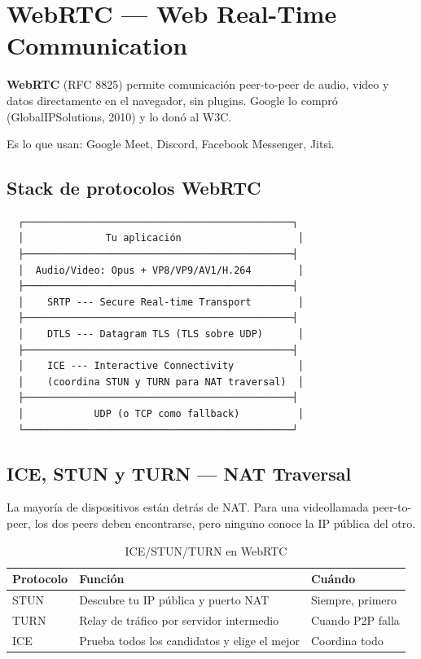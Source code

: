 \section{ WebRTC --- Web Real-Time Communication}

\begin{concepto}
\textbf{WebRTC} (RFC 8825) permite comunicación peer-to-peer de audio,
video y datos directamente en el navegador, sin plugins. Google lo compró
(GlobalIPSolutions, 2010) y lo donó al W3C.

Es lo que usan: Google Meet, Discord, Facebook Messenger, Jitsi.
\end{concepto}

\subsection{Stack de protocolos WebRTC}

\begin{lstlisting}
  ┌──────────────────────────────────────────────┐
  │              Tu aplicación                    │
  ├──────────────────────────────────────────────┤
  │  Audio/Video: Opus + VP8/VP9/AV1/H.264        │
  ├──────────────────────────────────────────────┤
  │    SRTP --- Secure Real-time Transport        │
  ├──────────────────────────────────────────────┤
  │    DTLS --- Datagram TLS (TLS sobre UDP)      │
  ├──────────────────────────────────────────────┤
  │    ICE --- Interactive Connectivity           │
  │    (coordina STUN y TURN para NAT traversal)  │
  ├──────────────────────────────────────────────┤
  │            UDP (o TCP como fallback)          │
  └──────────────────────────────────────────────┘
\end{lstlisting}

\subsection{ICE, STUN y TURN --- NAT Traversal}

La mayoría de dispositivos están detrás de NAT. Para una videollamada
peer-to-peer, los dos peers deben encontrarse, pero ninguno conoce la
IP pública del otro.

\begin{table}[h!]
\centering
\renewcommand{\arraystretch}{1.4}
\begin{tabular}{lll}
\toprule
\textbf{Protocolo} & \textbf{Función} & \textbf{Cuándo} \\
\midrule
STUN & Descubre tu IP pública y puerto NAT & Siempre, primero \\
TURN & Relay de tráfico por servidor intermedio & Cuando P2P falla \\
ICE  & Prueba todos los candidatos y elige el mejor & Coordina todo \\
\bottomrule
\end{tabular}
\caption{ICE/STUN/TURN en WebRTC}
\end{table}

